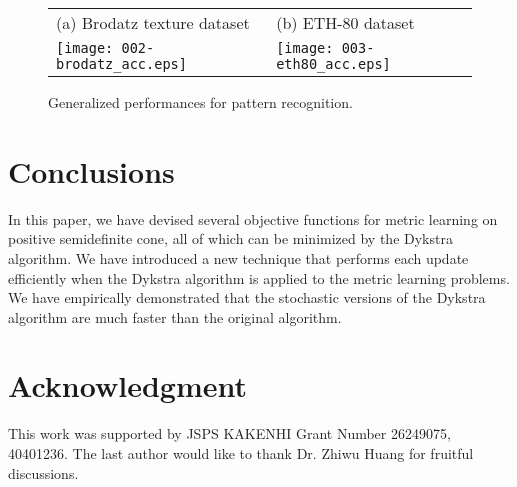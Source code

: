 \documentclass[10pt,onecolumn]{article}
\theoremstyle{definition}
\theoremstyle{definition}
\theoremstyle{definition}
\theoremstyle{definition}
\theoremstyle{definition}
\theoremstyle{theorem}
\newcommand{\0}{{\bm{0}}}
\newcommand{\1}{{\bm{1}}}
\begin{document}
\begin{figure*}[t!]
\begin{center}
  \begin{tabular}{ll}
    (a) Brodatz texture dataset
    & (b) ETH-80  dataset
    \\
    \texttt{[image: 002-brodatz\_acc.eps]}
    &
    \texttt{[image: 003-eth80\_acc.eps]}
\end{tabular}
\end{center}
\caption{Generalized performances for pattern recognition. \label{fig:accbars}}
\end{figure*}

\section{Conclusions}
%
In this paper, we have devised several objective functions
for metric learning on positive semidefinite cone, all of
which can be minimized by the Dykstra algorithm. We have
introduced a new technique that performs each update
efficiently when the Dykstra algorithm is applied to the
metric learning problems. We have empirically demonstrated
that the stochastic versions of the Dykstra algorithm are
much faster than the original algorithm.


\section*{Acknowledgment}
%
This work was supported by JSPS KAKENHI Grant Number
26249075, 40401236.
The last author would like to thank Dr. Zhiwu Huang for fruitful discussions.
\end{document}
